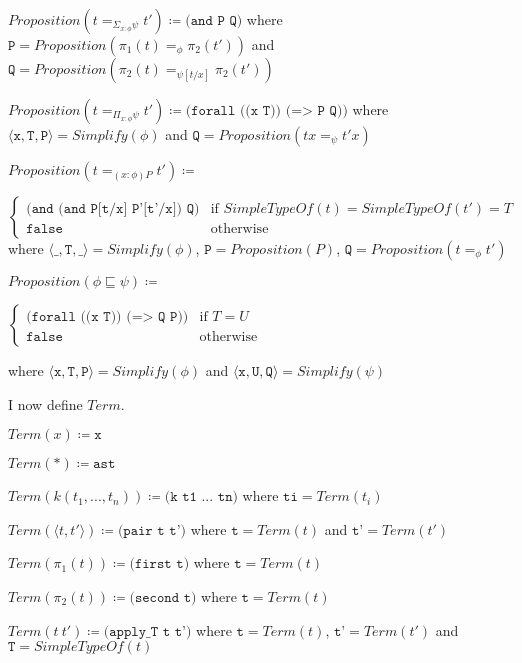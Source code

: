 \documentclass[12pt,a4paper,titlepage]{article}
\newcommand{\triple}[3]{\langle \texttt{#1} , \texttt{#2} , \texttt{#3} \rangle}
\begin{document}
    $Proposition(t =_{\Sigma_{x: \phi} \psi} t') \coloneqq
    \texttt{(and P Q)}$ where
    $\texttt{P} = Proposition(\pi_1 (t) =_\phi \pi_2 (t'))$ and
    $\texttt{Q} = Proposition(\pi_2 (t) =_{\psi[t/x]} \pi_2 (t'))$

    $Proposition(t =_{\Pi_{x: \phi} \psi} t') \coloneqq
    \texttt{(forall ((x T)) (=> P Q))}$
    where $\triple{x}{T}{P} = Simplify(\phi)$ and $\texttt{Q} = Proposition(tx =_\psi t'x)$

    $Proposition(t =_{(x: \phi)P} t') \coloneqq$

    $\begin{cases}
        \texttt{(and (and P[t/x] P'[t'/x]) Q)} & \text{if } SimpleTypeOf(t)=SimpleTypeOf(t')=T\\
        \texttt{false} & \text{otherwise}
    \end{cases}$
    where $\triple{\_}{T}{\_} = Simplify(\phi)$,
    $\texttt{P} = Proposition(P)$,
    $\texttt{Q} = Proposition(t =_\phi t')$

    $Proposition(\phi \sqsubseteq \psi) \coloneqq$

    $\begin{cases}
        \texttt{(forall ((x T)) (=> Q P))} & \text{if } T=U\\
        \texttt{false} & \text{otherwise}
    \end{cases}$

    where $\triple{x}{T}{P} = Simplify(\phi)$ and $\triple{x}{U}{Q} = Simplify(\psi)$

    I now define $Term$.

    $Term(x) \coloneqq \texttt{x}$

    $Term(\ast) \coloneqq \texttt{ast}$

    $Term(k(t_1, ..., t_n)) \coloneqq \texttt{(k t1 ... tn)}$ where $\texttt{ti} = Term(t_i)$

    $Term(\langle t, t' \rangle) \coloneqq \texttt{(pair t t')}$
    where $\texttt{t} = Term(t)$ and $\texttt{t'} = Term(t')$

    $Term(\pi_1 (t)) \coloneqq \texttt{(first t)}$ where $\texttt{t} = Term(t)$

    $Term(\pi_2 (t)) \coloneqq \texttt{(second t)}$ where $\texttt{t} = Term(t)$

    $Term(t\ t') \coloneqq \texttt{(apply\_T t t')}$
    where $\texttt{t} = Term(t)$, $\texttt{t'} = Term(t')$ and $\texttt{T} = SimpleTypeOf(t)$
\end{document}
